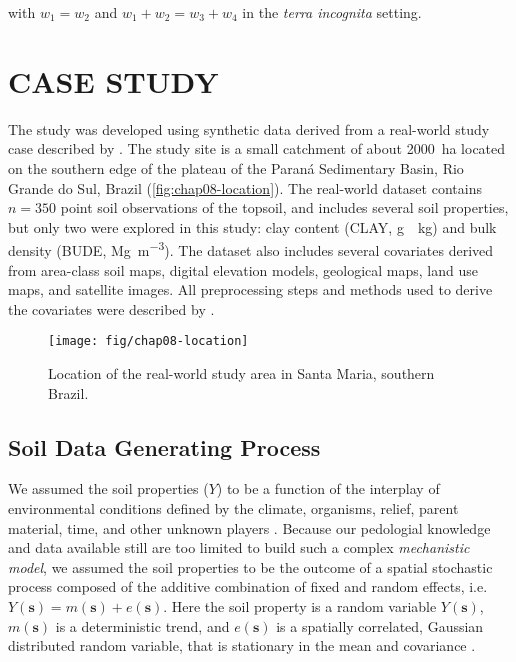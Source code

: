 with $w_1 = w_2$ and $w_1 + w_2 = w_3 + w_4$ in the \emph{terra incognita} setting.

\section{CASE STUDY}

The study was developed using synthetic data derived from a real-world study case described by 
\citet{Samuel-RosaEtAl2015}. The study site is a small catchment of about \SI{2000}{\hectare} located on the 
southern edge of the plateau of the Paraná Sedimentary Basin, Rio Grande do Sul, Brazil 
(\autoref{fig:chap08-location}). The real-world dataset contains $n = 350$ point soil observations of the 
topsoil, and includes several soil properties, but only two were explored in this study: clay content (CLAY, 
\si{\gram\pre\kilo\gram}) and bulk density (BUDE, \si{\mega\gram\per\cubic\metre}). The dataset also includes 
several covariates derived from area-class soil maps, digital elevation models, geological maps, land use maps, 
and satellite images. All preprocessing steps and methods used to derive the covariates were described by 
\citet{Samuel-RosaEtAl2015}.

\begin{figure}[!ht]
 \centering
 \texttt{[image: fig/chap08-location]}
 \caption{Location of the real-world study area in Santa Maria, southern Brazil.}
 \label{fig:chap08-location}
\end{figure}

\subsection{Soil Data Generating Process}

We assumed the soil properties ($Y$) to be a function of the interplay of environmental conditions defined by 
the climate, organisms, relief, parent material, time, and other unknown players \cite{Jenny1994, 
McBratneyEtAl2003, Florinsky2012}. Because our pedologial knowledge and data available still are too limited 
to build such a complex \emph{mechanistic model}, we assumed the soil properties to be the outcome of a 
spatial stochastic process composed of the additive combination of fixed and random effects, i.e. 
$Y(\boldsymbol{s}) = m(\boldsymbol{s}) + e(\boldsymbol{s})$. Here the soil property is a random variable 
$Y(\boldsymbol{s})$, $m(\boldsymbol{s})$ is a deterministic trend, and $e(\boldsymbol{s})$ is a spatially 
correlated, Gaussian distributed random variable, that is stationary in the mean and covariance 
\cite{HeuvelinkEtAl2001}.

